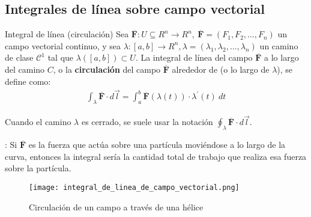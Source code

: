 \documentclass[a4paper, twoside]{article}
\numberwithin{equation}{section}
\numberwithin{figure}{section}
\numberwithin{table}{section}
\newcommand{\vect}[1]{\overline{\textbf{#1}}}
\begin{document}
\subsection{Integrales de línea sobre campo vectorial}
\begin{minipage}{0.6\textwidth}
	\begin{definicion*}{Integral de línea (circulación)}
		Sea $\vect{F}:U \subseteq R^n \to R^n,\:\vect{F}=(F_1,F_2,\ldots,F_n)$ un campo vectorial continuo, y sea $\lambda:[a,b] \to R^n,\lambda=(\lambda_1,\lambda_2,\ldots,\lambda_n)$ un camino de clase $\mathcal{C}^1$ tal que $\lambda ([a,b])\subset U$. La integral de línea del campo $\vect{F}$ a lo largo del camino $C$, o la \textbf{circulación} del campo $\vect{F}$ alrededor de (o lo largo de $\lambda$), se define como:
		\begin{align}
			\int_{\lambda} \vect{F} \cdot d\vec{l}=\int_{a}^{b} \vect{F}\left(\lambda(t)\right) \cdot \lambda^\prime(t)\: dt
		\end{align}
		
		Cuando el camino $\lambda$ es cerrado, se suele usar la notación $\oint_{\lambda} \vect{F} \cdot d\vec{l}$.

		: Si $\vect{F}$ es la fuerza que actúa sobre una partícula moviéndose a lo largo de la curva, entonces la integral sería la cantidad total de trabajo que realiza esa fuerza sobre la partícula.
	\end{definicion*}
\end{minipage}
\begin{minipage}{0.3\textwidth}
	\begin{figure}[H]
		\centering
		\texttt{[image: integral\_de\_linea\_de\_campo\_vectorial.png]}
		\caption{Circulación de un campo a través de una hélice}
	\end{figure}
\end{minipage}
\end{document}
